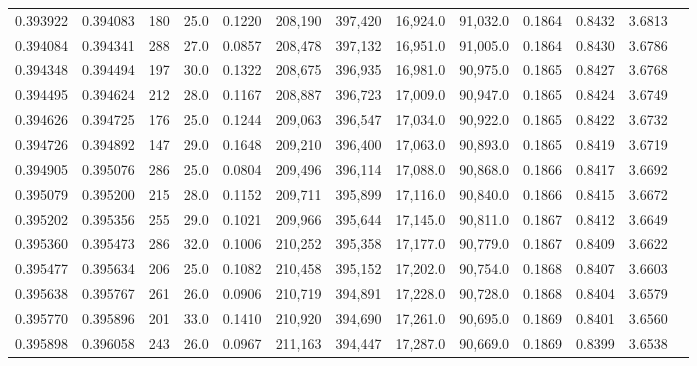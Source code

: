 \begin{tabular}{rrrrrrrrrrrrr}
0.393922 & 0.394083 &   180 & 25.0 &                                     0.1220 & 208,190 & 397,420 &  16,924.0 &  91,032.0 & 0.1864 & 0.8432 & 3.6813 \\
0.394084 & 0.394341 &   288 & 27.0 &                                     0.0857 & 208,478 & 397,132 &  16,951.0 &  91,005.0 & 0.1864 & 0.8430 & 3.6786 \\
0.394348 & 0.394494 &   197 & 30.0 &                                     0.1322 & 208,675 & 396,935 &  16,981.0 &  90,975.0 & 0.1865 & 0.8427 & 3.6768 \\
0.394495 & 0.394624 &   212 & 28.0 &                                     0.1167 & 208,887 & 396,723 &  17,009.0 &  90,947.0 & 0.1865 & 0.8424 & 3.6749 \\
0.394626 & 0.394725 &   176 & 25.0 &                                     0.1244 & 209,063 & 396,547 &  17,034.0 &  90,922.0 & 0.1865 & 0.8422 & 3.6732 \\
0.394726 & 0.394892 &   147 & 29.0 &                                     0.1648 & 209,210 & 396,400 &  17,063.0 &  90,893.0 & 0.1865 & 0.8419 & 3.6719 \\
0.394905 & 0.395076 &   286 & 25.0 &                                     0.0804 & 209,496 & 396,114 &  17,088.0 &  90,868.0 & 0.1866 & 0.8417 & 3.6692 \\
0.395079 & 0.395200 &   215 & 28.0 &                                     0.1152 & 209,711 & 395,899 &  17,116.0 &  90,840.0 & 0.1866 & 0.8415 & 3.6672 \\
0.395202 & 0.395356 &   255 & 29.0 &                                     0.1021 & 209,966 & 395,644 &  17,145.0 &  90,811.0 & 0.1867 & 0.8412 & 3.6649 \\
0.395360 & 0.395473 &   286 & 32.0 &                                     0.1006 & 210,252 & 395,358 &  17,177.0 &  90,779.0 & 0.1867 & 0.8409 & 3.6622 \\
0.395477 & 0.395634 &   206 & 25.0 &                                     0.1082 & 210,458 & 395,152 &  17,202.0 &  90,754.0 & 0.1868 & 0.8407 & 3.6603 \\
0.395638 & 0.395767 &   261 & 26.0 &                                     0.0906 & 210,719 & 394,891 &  17,228.0 &  90,728.0 & 0.1868 & 0.8404 & 3.6579 \\
0.395770 & 0.395896 &   201 & 33.0 &                                     0.1410 & 210,920 & 394,690 &  17,261.0 &  90,695.0 & 0.1869 & 0.8401 & 3.6560 \\
0.395898 & 0.396058 &   243 & 26.0 &                                     0.0967 & 211,163 & 394,447 &  17,287.0 &  90,669.0 & 0.1869 & 0.8399 & 3.6538 \\

\end{tabular}
